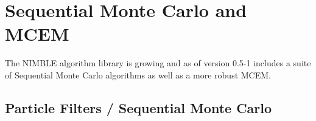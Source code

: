 \documentclass[12pt,oneside]{book}\usepackage[]{graphicx}\usepackage[]{color}
\def\cd#1{\texttt{#1}}
\begin{document}
% 
% 
% 
% 
% 
% 
% 
% 
% 
% 









\chapter{Sequential Monte Carlo and MCEM}
\label{cha:algos-provided}


The NIMBLE algorithm library is growing and as of version 0.5-1 includes a suite of Sequential Monte Carlo algorithms as well as a more robust MCEM. 

 

\section{Particle Filters / Sequential Monte Carlo}
\end{document}
